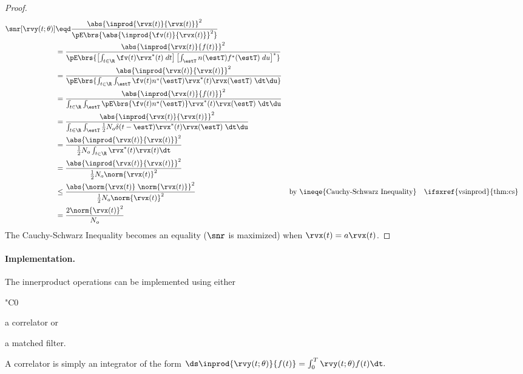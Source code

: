 \begin{proof}
\begin{align*}
   \snr[\rvy(t;\theta)]
     &\eqd \frac{\abs{\inprod{\rvx(t)}{\rvx(t)}}^2}
                {\pE\brs{\abs{\inprod{\fv(t)}{\rvx(t)}}^2}}
   \\&=    \frac{\abs{\inprod{\rvx(t)}{f(t)}}^2}
                {\pE\brs{\left[\int_{t\in\R} \fv(t)\rvx^\ast(t)\;dt\right]
                      \left[\int_{\estT} n(\estT)f^\ast(\estT)\;du\right]^\ast}
                }
   \\&=    \frac{\abs{\inprod{\rvx(t)}{\rvx(t)}}^2}
                {\pE\brs{\int_{t\in\R} \int_{\estT} \fv(t)n^\ast(\estT)\rvx^\ast(t)\rvx(\estT)\;\dt\du}}
   \\&=    \frac{\abs{\inprod{\rvx(t)}{f(t)}}^2}
                {\int_{t\in\R} \int_{\estT} \pE\brs{\fv(t)n^\ast(\estT)}\rvx^\ast(t)\rvx(\estT)\;\dt\du}
   \\&=    \frac{\abs{\inprod{\rvx(t)}{\rvx(t)}}^2}
                {\int_{t\in\R} \int_{\estT} \frac{1}{2}N_o\delta(t-\estT) \rvx^\ast(t)\rvx(\estT)\;\dt\du}
   \\&=    \frac{\abs{\inprod{\rvx(t)}{\rvx(t)}}^2}
                {\frac{1}{2}N_o \int_{t\in\R} \rvx^\ast(t)\rvx(t)\dt}
   \\&=    \frac{\abs{\inprod{\rvx(t)}{\rvx(t)}}^2}
                {\frac{1}{2}N_o \norm{\rvx(t)}^2}
   \\&\le  \frac{\abs{\norm{\rvx(t)}\;\norm{\rvx(t)}}^2}
                {\frac{1}{2}N_o \norm{\rvx(t)}^2}
     &&    \text{by \ineqe{Cauchy-Schwarz Inequality}}
     &&    \text{\ifsxref{vsinprod}{thm:cs}}
   \\&=    \frac{2\norm{\rvx(t)}^2}
                {N_o }
\end{align*}
The Cauchy-Schwarz Inequality becomes an equality
($\snr$ is maximized) when $\rvx(t)=a\rvx(t)$.
\end{proof}

\paragraph{Implementation.}
The innerproduct operations can be implemented using either
  \begin{dingautolist}{"C0}
     \item a correlator or
     \item a matched filter.
  \end{dingautolist}

A correlator is simply an integrator of the form
   $\ds\inprod{\rvy(t;\theta)}{f(t)} = \int_0^T \rvy(t;\theta)f(t)\dt.$

